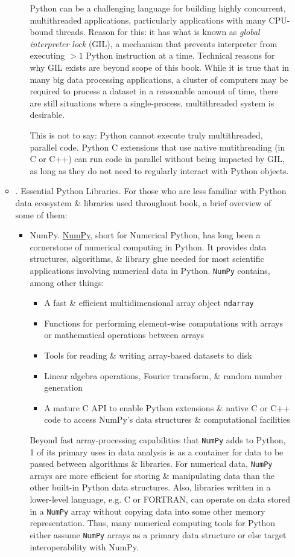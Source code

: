 \documentclass{article}
\begin{document}
\begin{itemize}
\begin{itemize}
\begin{itemize}
			Python can be a challenging language for building highly concurrent, multithreaded applications, particularly applications with many CPU-bound threads. Reason for this: it has what is known as {\it global interpreter lock} (GIL), a mechanism that prevents interpreter from executing $> 1$ Python instruction at a time. Technical reasons for why GIL exists are beyond scope of this book. While it is true that in many big data processing applications, a cluster of computers may be required to process a dataset in a reasonable amount of time, there are still situations where a single-process, multithreaded system is desirable.
			
			This is not to say: Python cannot execute truly multithreaded, parallel code. Python C extensions that use native mutithreading (in C or C++) can run code in parallel without being impacted by GIL, as long as they do not need to regularly interact with Python objects.
		\end{itemize}
		\item {. Essential Python Libraries.} For those who are less familiar with Python data ecosystem \& libraries used throughout book, a brief overview of some of them:
		\begin{itemize}
			\item {\sf NumPy.} \href{https://numpy.org}{NumPy}, short for Numerical Python, has long been a cornerstone of numerical computing in Python. It provides data structures, algorithms, \& library glue needed for most scientific applications involving numerical data in Python. {\tt NumPy} contains, among other things:
			\begin{itemize}
				\item A fast \& efficient multidimensional array object {\tt ndarray}
				\item Functions for performing element-wise computations with arrays or mathematical operations between arrays
				\item Tools for reading \& writing array-based datasets to disk
				\item Linear algebra operations, Fourier transform, \& random number generation
				\item A mature C API to enable Python extensions \& native C or C++ code to access NumPy's data structures \& computational facilities
			\end{itemize}
			Beyond fast array-processing capabilities that {\tt NumPy} adds to Python, 1 of its primary uses in data analysis is as a container for data to be passed between algorithms \& libraries. For numerical data, {\tt NumPy} arrays are more efficient for storing \& manipulating data than the other built-in Python data structures. Also, libraries written in a lower-level language, e.g. C or FORTRAN, can operate on data stored in a {\tt NumPy} array without copying data into some other memory representation. Thus, many numerical computing tools for Python either assume {\tt NumPy} arrays as a primary data structure or else target interoperability with NumPy.

\end{itemize}
\end{itemize}
\end{itemize}
\end{document}
